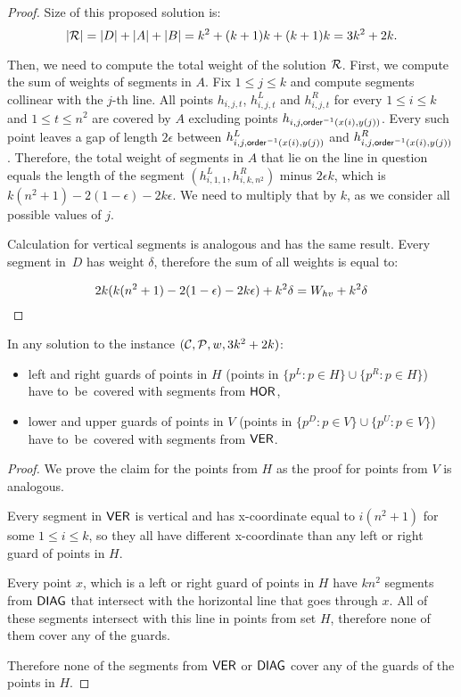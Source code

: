 \begin{proof}
Size of this proposed solution is:
$$|\mathcal{R}| = |D| + |A| + |B| = k^2 + (k+1)k + (k+1)k = 3k^2+2k.$$

Then, we need to compute the total weight of the solution $\mathcal{R}$.
First, we compute the sum of weights of segments in $A$.
Fix $1 \le j \le k$ and compute segments collinear with the $j$-th line.
All points $h_{i,j,t}$, $h_{i,j,t}^L$ and $h_{i,j,t}^R$
for every $1 \le i \le k$ and $1 \le t \le n^2$ are covered by $A$
excluding points $h_{i,j,\mathsf{order}^{-1}(x(i),y(j))}$.
Every such point leaves a gap of length $2\epsilon$ between
$h_{i,j,\mathsf{order}^{-1}(x(i),y(j))}^L$ and $h_{i,j,\mathsf{order}^{-1}(x(i),y(j))}^R$.
Therefore, the total weight of segments in $A$
that lie on the line in question equals the length of the segment
$(h_{i,1,1}^L, h_{i,k,n^2}^R)$
minus $2\epsilon k$, which is $k(n^2+1) -2(1-\epsilon)-2k\epsilon$.
We need to multiply that by $k$, as we consider all possible values of $j$.

Calculation for vertical segments is analogous and has the same result.
Every segment in~$D$ has weight $\delta$, therefore the sum of all weights
is equal to:

$$2k(k(n^2+1) -2(1-\epsilon)-2k\epsilon) + k^2\delta= W_{hv} +k^2\delta$$
\end{proof}


\begin{claim}
\label{guards}
In any solution to the instance $(\mathcal{C}, \mathcal{P}, w, 3k^2+2k)$:
\begin{itemize}
\item left and right guards of points in $H$
(points in $\{p^L : p \in H\} \cup \{p^R : p \in H\}$)
have to~be~covered with segments from $\mathsf{HOR}$,
\item lower and upper guards of points in $V$
(points in $\{p^D : p \in V\} \cup \{p^U : p \in V\}$)
have to~be~covered with segments from $\mathsf{VER}$.
\end{itemize}
\end{claim}

\begin{proof}
We prove the claim for the points from $H$
as the proof for points from $V$ is analogous.

Every segment in $\mathsf{VER}$ is vertical and 
has x-coordinate equal to $i(n^2+1)$ for some $1\le i \le k$,
so they all have different x-coordinate
than any left or right guard of points in $H$.

Every point $x$, which is a left or right guard of points in $H$
have $kn^2$ segments from $\mathsf{DIAG}$ that intersect with the horizontal
line that goes through $x$. All of these segments intersect with
this line in points from set $H$, therefore none of them
cover any of the guards.

Therefore none of the segments from $\mathsf{VER}$ or $\mathsf{DIAG}$ cover any
of the guards of the points in $H$.
\end{proof}

